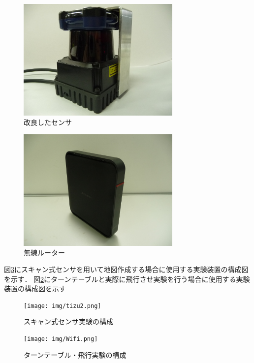 \documentclass[12pt,oneside]{sotsuken_paper}
\begin{document}
\begin{figure}[H]
\begin{center}
\includegraphics[width=80mm]{img/sensakai.jpg}
\end{center}
\caption{改良したセンサ}
\label{fig:sensakai}
\end{figure}

\begin{figure}[H]
\begin{center}
\includegraphics[width=80mm]{img/rutor.jpg}
\end{center}
\caption{無線ルーター}
\label{fig:rutor}
\end{figure}

図\ref{fig:tizu2}にスキャン式センサを用いて地図作成する場合に使用する実験装置の構成図を示す．
図\ref{fig:rutor}にターンテーブルと実際に飛行させ実験を行う場合に使用する実験装置の構成図を示す

\begin{figure}[H]
\begin{center}
\texttt{[image: img/tizu2.png]}
\end{center}
\caption{スキャン式センサ実験の構成}
\label{fig:tizu2}
\end{figure}

\begin{figure}[H]
\begin{center}
\texttt{[image: img/Wifi.png]}
\end{center}
\caption{ターンテーブル・飛行実験の構成}
\label{fig:Wifi}
\end{figure}
\end{document}
